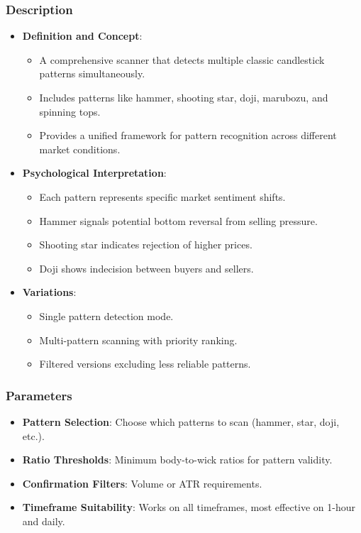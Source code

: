 \documentclass[12pt]{article}
\begin{document}
\subsubsection{Description}
\begin{itemize}
\item \textbf{Definition and Concept}:
  \begin{itemize}
  \item A comprehensive scanner that detects multiple classic candlestick patterns simultaneously.
  \item Includes patterns like hammer, shooting star, doji, marubozu, and spinning tops.
  \item Provides a unified framework for pattern recognition across different market conditions.
  \end{itemize}
\item \textbf{Psychological Interpretation}:
  \begin{itemize}
  \item Each pattern represents specific market sentiment shifts.
  \item Hammer signals potential bottom reversal from selling pressure.
  \item Shooting star indicates rejection of higher prices.
  \item Doji shows indecision between buyers and sellers.
  \end{itemize}
\item \textbf{Variations}:
  \begin{itemize}
  \item Single pattern detection mode.
  \item Multi-pattern scanning with priority ranking.
  \item Filtered versions excluding less reliable patterns.
  \end{itemize}
\end{itemize}

\subsubsection{Parameters}
\begin{itemize}
\item \textbf{Pattern Selection}: Choose which patterns to scan (hammer, star, doji, etc.).
\item \textbf{Ratio Thresholds}: Minimum body-to-wick ratios for pattern validity.
\item \textbf{Confirmation Filters}: Volume or ATR requirements.
\item \textbf{Timeframe Suitability}: Works on all timeframes, most effective on 1-hour and daily.
\end{itemize}
\end{document}
